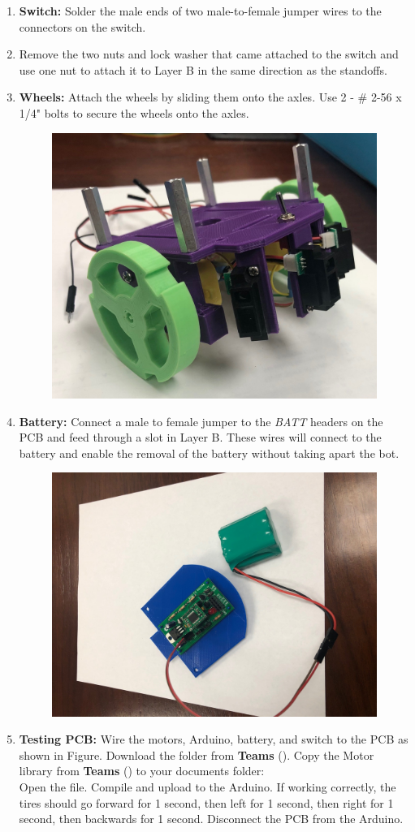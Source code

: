 \documentclass{handout}
\begin{document}
\begin{enumerate}
		\item \textbf{Switch:} Solder the male ends of two male-to-female jumper wires to the connectors on the switch.
		\item Remove the two nuts and lock washer that came attached to the switch and use one nut to attach it to Layer B in the same direction as the standoffs.
		
		\item \textbf{Wheels:} Attach the wheels by sliding them onto the axles. Use 2 - \# 2-56 x 1/4" bolts to secure the wheels onto the axles.
		
		\begin{figure} [H]
			\centering
			\includegraphics[width=.3\textwidth]{4.jpg}
		\end{figure}
		
		\item \textbf{Battery:} Connect a male to female jumper to the \textit{BATT} headers on the PCB and feed through a slot in Layer B. These wires will connect to the battery and enable the removal of the battery without taking apart the bot.
		
		\begin{figure} [H]
			\centering
			\includegraphics[width=.75\textwidth]{5.jpg}
		\end{figure}
		
		\item \textbf{Testing PCB:} Wire the motors, Arduino, battery, and switch to the PCB as shown in Figure. Download the  folder from \textbf{Teams} (). Copy the Motor library from \textbf{Teams} () to your documents folder: \\ Open the  file. Compile and upload to the Arduino. If working correctly, the tires should go forward for 1 second, then left for 1 second, then right for 1 second, then backwards for 1 second. Disconnect the PCB from the Arduino.
		

\end{enumerate}
\end{document}
